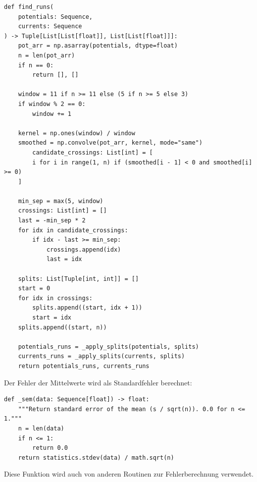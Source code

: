 \newpage
\begin{verbatim}
def find_runs(
    potentials: Sequence,
    currents: Sequence
) -> Tuple[List[List[float]], List[List[float]]]:
    pot_arr = np.asarray(potentials, dtype=float)
    n = len(pot_arr)
    if n == 0:
        return [], []

    window = 11 if n >= 11 else (5 if n >= 5 else 3)
    if window % 2 == 0:
        window += 1

    kernel = np.ones(window) / window
    smoothed = np.convolve(pot_arr, kernel, mode="same")
        candidate_crossings: List[int] = [
        i for i in range(1, n) if (smoothed[i - 1] < 0 and smoothed[i] >= 0)
    ]

    min_sep = max(5, window)
    crossings: List[int] = []
    last = -min_sep * 2
    for idx in candidate_crossings:
        if idx - last >= min_sep:
            crossings.append(idx)
            last = idx

    splits: List[Tuple[int, int]] = []
    start = 0
    for idx in crossings:
        splits.append((start, idx + 1))
        start = idx
    splits.append((start, n))

    potentials_runs = _apply_splits(potentials, splits)
    currents_runs = _apply_splits(currents, splits)
    return potentials_runs, currents_runs
\end{verbatim}

\newpage

Der Fehler der Mittelwerte wird als Standardfehler berechnet:
\begin{verbatim}
def _sem(data: Sequence[float]) -> float:
    """Return standard error of the mean (s / sqrt(n)). 0.0 for n <= 1."""
    n = len(data)
    if n <= 1:
        return 0.0
    return statistics.stdev(data) / math.sqrt(n)
\end{verbatim}

Diese Funktion wird auch von anderen Routinen zur Fehlerberechnung verwendet.

